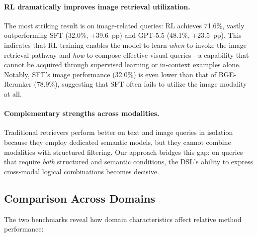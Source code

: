 \documentclass[11pt]{article}
\begin{document}
\paragraph{RL dramatically improves image retrieval utilization.}
The most striking result is on image-related queries: RL achieves 71.6\%, vastly outperforming SFT (32.0\%, +39.6~pp) and GPT-5.5 (48.1\%, +23.5~pp). This indicates that RL training enables the model to learn \emph{when} to invoke the image retrieval pathway and \emph{how} to compose effective visual queries---a capability that cannot be acquired through supervised learning or in-context examples alone. Notably, SFT's image performance (32.0\%) is even lower than that of BGE-Reranker (78.9\%), suggesting that SFT often fails to utilize the image modality at all.

\paragraph{Complementary strengths across modalities.}
Traditional retrievers perform better on text and image queries in isolation because they employ dedicated semantic models, but they cannot combine modalities with structured filtering. Our approach bridges this gap: on queries that require \emph{both} structured and semantic conditions, the DSL's ability to express cross-modal logical combinations becomes decisive.


\subsection{Comparison Across Domains}
\label{sec:cross_domain}

The two benchmarks reveal how domain characteristics affect relative method performance:
\end{document}
